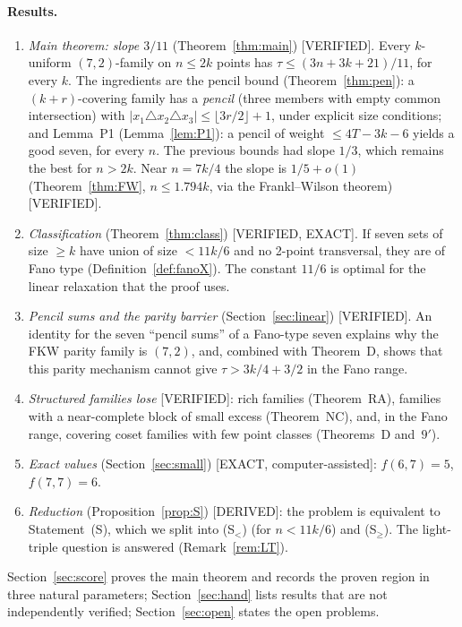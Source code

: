 \documentclass[11pt]{article}
\theoremstyle{definition}
\newcommand{\st}[1]{\textsf{\small[#1]}}
\begin{document}
\paragraph{Results.}
\begin{enumerate}[leftmargin=*]
\item \emph{Main theorem: slope $3/11$} (Theorem~\ref{thm:main}) \st{VERIFIED}. Every $k$-uniform $(7,2)$-family on
$n\le2k$ points has $\tau\le(3n+3k+21)/11$, for every $k$. The ingredients are the pencil bound
(Theorem~\ref{thm:pen}): a $(k+r)$-covering family has a \emph{pencil} (three members with empty common intersection)
with $|x_1\triangle x_2\triangle x_3|\le\lfloor3r/2\rfloor+1$, under explicit size conditions; and Lemma~P1
(Lemma~\ref{lem:P1}): a pencil of weight $\le4T-3k-6$ yields a good seven, for every $n$. The previous bounds had
slope $1/3$, which remains the best for $n>2k$. Near $n=7k/4$ the slope is $1/5+o(1)$
(Theorem~\ref{thm:FW}, $n\le1.794k$, via the Frankl--Wilson theorem) \st{VERIFIED}.
\item \emph{Classification} (Theorem~\ref{thm:class}) \st{VERIFIED, EXACT}. If seven sets of size $\ge k$ have union
of size $<11k/6$ and no 2-point transversal, they are of Fano type (Definition~\ref{def:fanoX}). The constant $11/6$ is
optimal for the linear relaxation that the proof uses.
\item \emph{Pencil sums and the parity barrier} (Section~\ref{sec:linear}) \st{VERIFIED}. An identity for the seven
``pencil sums'' of a Fano-type seven explains why the FKW parity family is $(7,2)$, and, combined with Theorem~D,
shows that this parity mechanism cannot give $\tau>3k/4+3/2$ in the Fano range.
\item \emph{Structured families lose} \st{VERIFIED}: rich families (Theorem~RA), families with a near-complete block of
small excess (Theorem~NC), and, in the Fano range, covering coset families with few point classes (Theorems~D and~$9'$).
\item \emph{Exact values} (Section~\ref{sec:small}) \st{EXACT, computer-assisted}: $f(6,7)=5$, $f(7,7)=6$.
\item \emph{Reduction} (Proposition~\ref{prop:S}) \st{DERIVED}: the problem is equivalent to Statement~(S), which we
split into (S$_<$) (for $n<11k/6$) and (S$_\ge$). The light-triple question is answered (Remark~\ref{rem:LT}).
\end{enumerate}
Section~\ref{sec:score} proves the main theorem and records the proven region in three natural parameters; Section~\ref{sec:hand} lists results
that are not independently verified; Section~\ref{sec:open} states the open problems.
\end{document}

